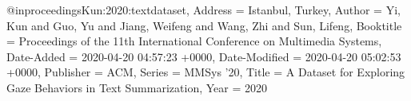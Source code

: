 @inproceedings{Kun:2020:textdataset,
Address = {Istanbul, Turkey},
Author = {Yi, Kun and Guo, Yu and Jiang, Weifeng and Wang, Zhi and Sun, Lifeng},
Booktitle = {Proceedings of the 11th International Conference on Multimedia Systems},
Date-Added = {2020-04-20 04:57:23 +0000},
Date-Modified = {2020-04-20 05:02:53 +0000},
Publisher = {ACM},
Series = {MMSys '20},
Title = {A Dataset for Exploring Gaze Behaviors in Text Summarization},
Year = {2020}}